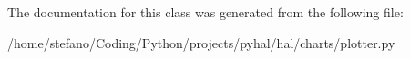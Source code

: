 The documentation for this class was generated from the following file\+:\begin{DoxyCompactItemize}
\item 
/home/stefano/\+Coding/\+Python/projects/pyhal/hal/charts/plotter.\+py\end{DoxyCompactItemize}
